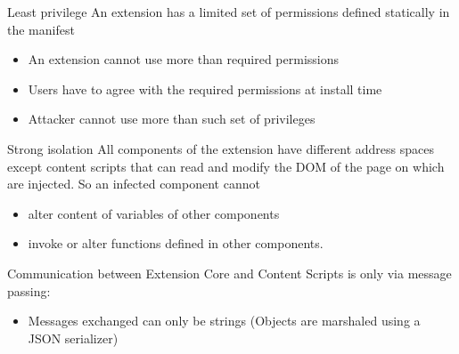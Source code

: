 \documentclass[11pt]{beamer}
\begin{document}
\begin{frame}{Least privilege}
An extension has a limited set of permissions defined statically in the manifest
\begin{itemize}
\item An extension cannot use more than required permissions
\item Users have to agree with the required permissions at install time
\item Attacker cannot use more than such set of privileges
\end{itemize}
\end{frame}

\begin{frame}{Strong isolation}
All components of the extension have different address spaces except content scripts that can read and modify the DOM of the page on which are injected. So an infected component cannot
\begin{itemize}
\item alter content of variables of other components
\item invoke or alter functions defined in other components.
\end{itemize}

Communication between Extension Core and Content Scripts is only via message passing:
\begin{itemize}
\item Messages exchanged can only be strings (Objects are marshaled using a JSON serializer)
\end{itemize}
\end{frame}

\end{document}
